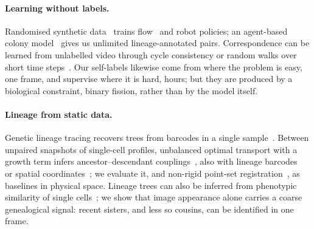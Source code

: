 \paragraph{Learning without labels.}
Randomised synthetic data~\cite{tobin2017domain} trains flow~\cite{dosovitskiy2015flownet} and robot policies; an agent-based colony model~\cite{rudge2012cellmodeller} gives us unlimited lineage-annotated pairs.
Correspondence can be learned from unlabelled video through cycle consistency or random walks over short time steps~\cite{wang2019learning,jabri2020space}.
Our self-labels likewise come from where the problem is easy, one frame, and supervise where it is hard, hours; but they are produced by a biological constraint, binary fission, rather than by the model itself.

\paragraph{Lineage from static data.}
Genetic lineage tracing recovers trees from barcodes in a single sample~\cite{wagner2020lineage}.
Between unpaired snapshots of single-cell profiles, unbalanced optimal transport with a growth term infers ancestor--descendant couplings~\cite{schiebinger2019optimal}, also with lineage barcodes~\cite{forrow2021lineageot} or spatial coordinates~\cite{klein2025moscot}; we evaluate it, and non-rigid point-set registration~\cite{myronenko2010cpd}, as baselines in physical space.
Lineage trees can also be inferred from phenotypic similarity of single cells~\cite{kuang2025celltreeqm}; we show that image appearance alone carries a coarse genealogical signal: recent sisters, and less so cousins, can be identified in one frame.
